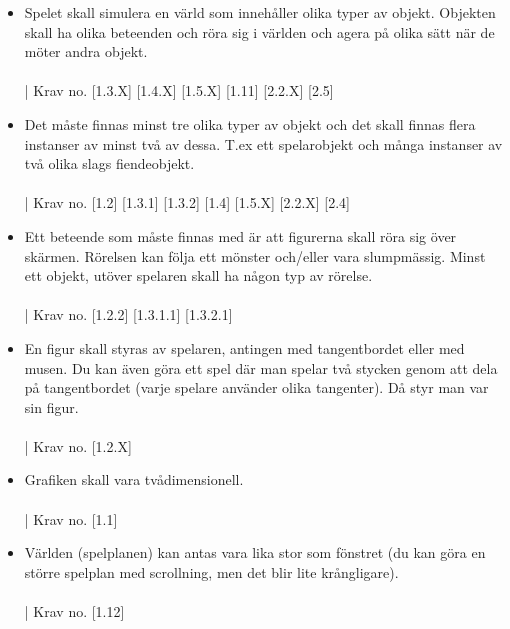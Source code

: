 \documentclass{TDP005mall}
\begin{document}
\begin{itemize}
    \item Spelet skall simulera en värld som innehåller olika typer av objekt. Objekten skall ha olika beteenden och röra sig i världen och agera på olika sätt när de möter andra objekt.\\
    \\| Krav no. [1.3.X] [1.4.X] [1.5.X] [1.11] [2.2.X] [2.5]\\

    \item Det måste finnas minst tre olika typer av objekt och det skall finnas flera instanser av minst två av dessa. T.ex ett spelarobjekt och många instanser av två olika slags fiendeobjekt.\\
    \\| Krav no. [1.2] [1.3.1] [1.3.2] [1.4] [1.5.X] [2.2.X] [2.4]\\

    \item Ett beteende som måste finnas med är att figurerna skall röra sig över skärmen. Rörelsen kan följa ett mönster och/eller vara slumpmässig. Minst ett objekt, utöver spelaren skall ha någon typ av rörelse.\\
    \\| Krav no. [1.2.2] [1.3.1.1] [1.3.2.1]\\

    \item En figur skall styras av spelaren, antingen med tangentbordet eller med musen. Du kan även göra ett spel där man spelar två stycken genom att dela på tangentbordet (varje spelare använder olika tangenter). Då styr man var sin figur.\\
    \\| Krav no. [1.2.X]\\

    \item Grafiken skall vara tvådimensionell.\\
    \\| Krav no. [1.1]\\

    \item Världen (spelplanen) kan antas vara lika stor som fönstret (du kan göra en större spelplan med scrollning, men det blir lite krångligare).\\
    \\| Krav no. [1.12]\\


\end{itemize}
\end{document}

